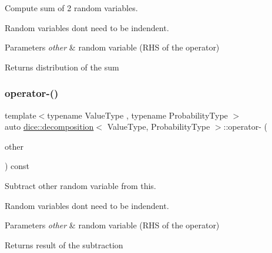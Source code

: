 Compute sum of 2 random variables. 

Random variables don\textquotesingle{}t need to be indendent.


\begin{DoxyParams}{Parameters}
{\em other} & random variable (R\+HS of the operator)\\
\hline
\end{DoxyParams}
\begin{DoxyReturn}{Returns}
distribution of the sum 
\end{DoxyReturn}
\mbox{\label{classdice_1_1decomposition_ae6bf072b8ba3615e85c3db38e5d78b4f}} 
\subsubsection{\texorpdfstring{operator-\/()}{operator-()}\hspace{0.1cm}{\footnotesize\ttfamily [1/2]}}
{\footnotesize\ttfamily template$<$typename Value\+Type , typename Probability\+Type $>$ \\
auto \mbox{\hyperlink{classdice_1_1decomposition}{dice\+::decomposition}}$<$ Value\+Type, Probability\+Type $>$\+::operator-\/ (\begin{DoxyParamCaption}\item[{const \mbox{\hyperlink{classdice_1_1decomposition}{decomposition}}$<$ Value\+Type, Probability\+Type $>$ \&}]{other }\end{DoxyParamCaption}) const\hspace{0.3cm}{\ttfamily [inline]}}



Subtract other random variable from this. 

Random variables don\textquotesingle{}t need to be indendent.


\begin{DoxyParams}{Parameters}
{\em other} & random variable (R\+HS of the operator)\\
\hline
\end{DoxyParams}
\begin{DoxyReturn}{Returns}
result of the subtraction 
\end{DoxyReturn}
\mbox{\label{classdice_1_1decomposition_a8d70dd95d1923cfb4b7b41d47dd43f33}} 
